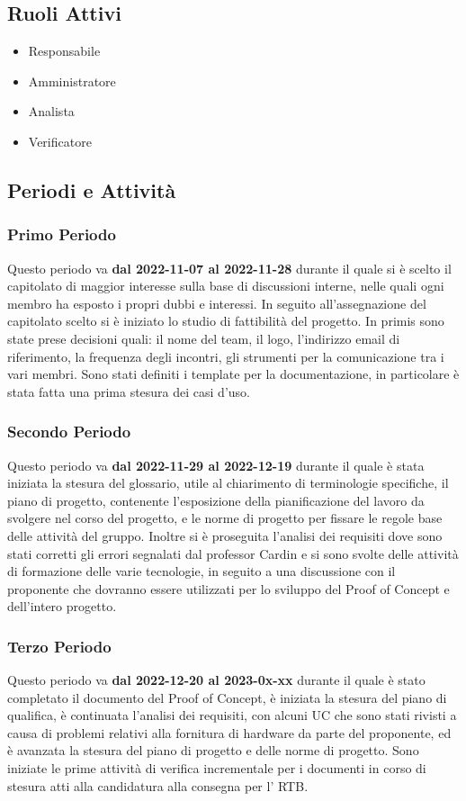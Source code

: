 \subsection{Ruoli Attivi}
\begin{itemize}
    \item Responsabile
    \item Amministratore
    \item Analista
    \item Verificatore
\end{itemize}

\subsection{Periodi e Attività}

\subsubsection{Primo Periodo}
Questo periodo va \textbf{dal 2022-11-07 al 2022-11-28} durante il quale si è scelto il capitolato di maggior interesse sulla base di discussioni interne, nelle quali ogni membro ha esposto i propri dubbi e interessi. In seguito all'assegnazione del capitolato scelto si è iniziato lo studio di fattibilità del progetto. 
In primis sono state prese decisioni quali: il nome del team, il logo, l’indirizzo email di riferimento, la frequenza degli incontri, gli strumenti per la comunicazione tra i vari membri.
Sono stati definiti i template per la documentazione, in particolare è stata fatta una prima stesura dei casi d'uso.

\subsubsection{Secondo Periodo}
Questo periodo va \textbf{dal 2022-11-29 al 2022-12-19} durante il quale è stata iniziata la stesura del glossario, utile al chiarimento di terminologie specifiche, il piano di progetto, contenente l’esposizione della pianificazione del lavoro da svolgere nel corso del progetto, e le norme di progetto per fissare le regole base delle attività del gruppo. 
Inoltre si è proseguita l'analisi dei requisiti dove sono stati corretti gli errori segnalati dal professor Cardin e si sono svolte delle attività di formazione delle varie tecnologie, in seguito a una discussione con il proponente che dovranno essere utilizzati per lo sviluppo del Proof of Concept e dell’intero progetto.

\subsubsection{Terzo Periodo}
Questo periodo va \textbf{dal 2022-12-20 al 2023-0x-xx} durante il quale è stato completato il documento del Proof of Concept, è iniziata la stesura del piano di qualifica, è continuata l'analisi dei requisiti, con alcuni UC che sono stati rivisti a causa di problemi relativi alla fornitura di hardware da parte del proponente, ed è avanzata la stesura del piano di progetto e delle norme di progetto.
Sono iniziate le prime attività di verifica incrementale per i documenti in corso di stesura atti alla candidatura alla consegna per l' RTB.


